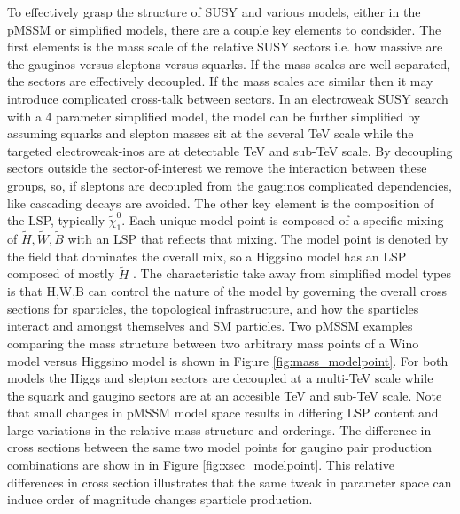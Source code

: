 To effectively grasp the structure of SUSY and various models, either in the pMSSM or simplified models, there are a couple key elements to condsider. The first elements is the mass scale of the relative SUSY sectors i.e. how massive are the gauginos versus sleptons versus squarks. If the mass scales are well separated, the sectors are effectively decoupled. If the mass scales are similar then it may introduce complicated cross-talk between sectors. In an electroweak SUSY search with a 4 parameter simplified model, the model can be further simplified by assuming squarks and slepton masses sit at the several TeV scale while the targeted electroweak-inos are at detectable  TeV and sub-TeV scale.  By decoupling sectors outside the sector-of-interest we remove the interaction between these groups, so, if sleptons are decoupled from the gauginos complicated dependencies, like cascading decays are avoided. The other key element is the composition of the LSP, typically $\tilde{\chi}^0_1$. Each unique model point is composed of a specific mixing of $\tilde{H},\tilde{W},\tilde{B}$ with an LSP that reflects that mixing. The model point is denoted by the field that dominates the overall mix, so a Higgsino model has an LSP composed of mostly $\tilde{H}$ \cite{ATLAS:2015wrn}. The characteristic take away from simplified model types is that H,W,B  can control the nature of the model by governing the overall cross sections for sparticles, the topological infrastructure, and how the sparticles interact and amongst themselves and SM particles. Two pMSSM examples comparing the mass structure between two arbitrary mass points of a Wino model versus Higgsino model is shown in Figure \ref{fig:mass_modelpoint}. For both models the Higgs and slepton sectors are decoupled at a multi-TeV scale while the squark and gaugino sectors are at an accesible TeV and sub-TeV scale. Note that small changes in pMSSM model space results in differing LSP content and large variations in the relative mass structure and orderings. The difference in cross sections between the same two model points for gaugino pair production combinations are show in in Figure \ref{fig:xsec_modelpoint}. This relative differences in cross section illustrates that the same tweak in parameter space can induce order of magnitude changes sparticle production.




